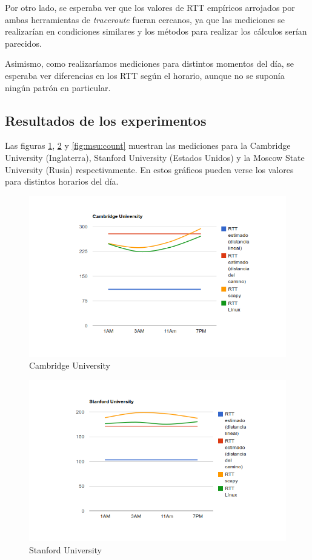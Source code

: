 Por otro lado, se esperaba ver que los valores de RTT empíricos arrojados por
ambas herramientas de \emph{traceroute} fueran cercanos, ya que las mediciones
se realizarían en condiciones similares y los métodos para realizar los
cálculos serían parecidos.

Asimismo, como realizaríamos mediciones para distintos momentos del día, se
esperaba ver diferencias en los RTT según el horario, aunque no se suponía
ningún patrón en particular.

\subsection{Resultados de los experimentos}

Las figuras \ref{fig:cambridge:count}, \ref{fig:stanford:count} y
\ref{fig:msu:count} muestran las mediciones para la Cambridge University
(Inglaterra), Stanford University (Estados Unidos) y la Moscow State
University (Rusia) respectivamente. En estos gráficos pueden verse los valores
para distintos horarios del día.

\begin{figure}[h!]
    \centering
    \includegraphics[width=400pt]{cambridge.png}
    \caption{Cambridge University}
    \label{fig:cambridge:count}
\end{figure}

\begin{figure}[h!]
    \centering
    \includegraphics[width=400pt]{stanford.png}
    \caption{Stanford University}
    \label{fig:stanford:count}
\end{figure}

